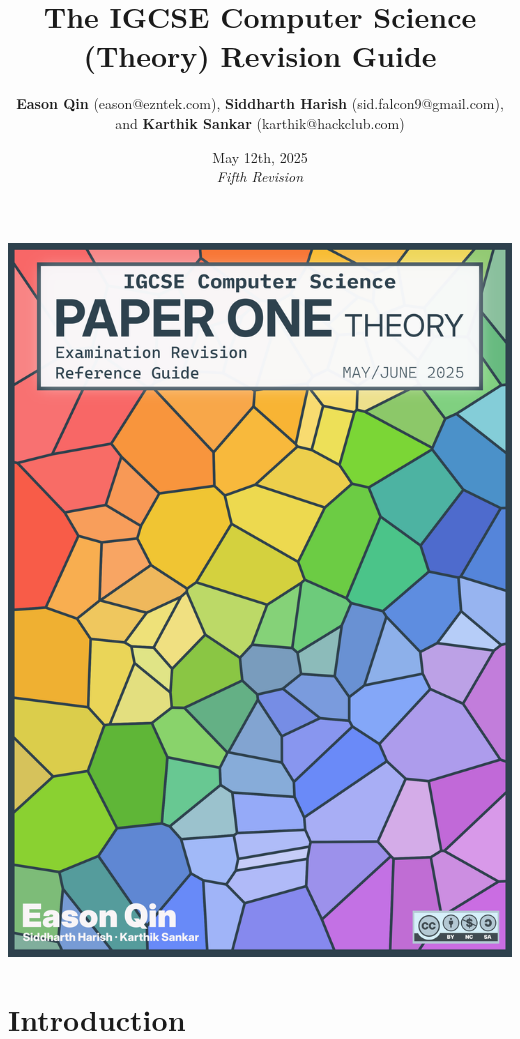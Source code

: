 \documentclass[a4paper, oneside, 11pt]{book} %
\title{The IGCSE Computer Science (Theory) Revision Guide}
\author{\textbf{Eason Qin} (eason@ezntek.com), \textbf{Siddharth Harish} (sid.falcon9@gmail.com), \\and \textbf{Karthik Sankar} (karthik@hackclub.com)}
\date{May 12th, 2025\\\emph{Fifth Revision}}
\begin{document}

\clearpage
\thispagestyle{empty}
\noindent
\includegraphics[width=\paperwidth,height=\paperheight,keepaspectratio=false]{cover.png}
\clearpage
\restoregeometry

\maketitle
\label{table-of-contents}
\tableofcontents

\chapter*{Introduction}
\label{introduction}

\end{document}

